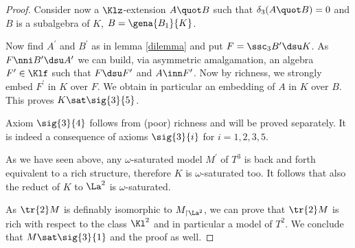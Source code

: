 \begin{proof}
Consider now a $\Klz$-extension $A\quot B$ such that $\delta_{3}(A\quot B)=0$ and $B$ is a subalgebra
of $K$, $B=\gena{B_{1}}{K}$.

Now find $A^{\prime}$ and $B^{\prime}$ as in lemma \ref{dilemma} and 
put $F=\ssc_{3}B^{\prime}\dsu K$. As $F\nni B^{\prime}\dsu A^{\prime}$ we can build, via asymmetric amalgamation, an algebra $F^{\prime}\in\Klf$ such
that $F\dsu F^{\prime}$ and $A\inn F^{\prime}$. Now by richness, we strongly embed $F^{\prime}$ in $K$ over $F$. We obtain in particular an embedding of $A$ in $K$ over $B$.
This proves $K\sat\sig{3}{5}$.

Axiom $\sig{3}{4}$ follows from (poor) richness and will be proved separately. It is indeed a consequence
of axioms $\sig{3}{i}$ for $i=1,2,3,5$.

As we have seen above, any $\omega$-saturated model $M^{\prime}$ of $T^{3}$ is back and forth
equivalent to a rich structure, therefore $K$ is $\omega$-saturated too.
It follows that also the reduct of $K$ to $\La^{2}$ is $\omega$-saturated.
 
As $\tr{2}M$ is definably isomorphic to
$M_{\upharpoonright\La^{2}}$, we can prove that $\tr{2}M$ is rich with respect to the class $\Kl^{2}$ and 
in particular a model of $T^{2}$.
We conclude that $M\sat\sig{3}{1}$ and the proof as well.
\end{proof}